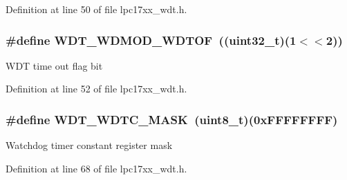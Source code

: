 \-Definition at line 50 of file lpc17xx\-\_\-wdt.\-h.

\hypertarget{group___w_d_t___private___macros_ga5e9c3c0c485b694053bdd3e43d5a9730}{
\subsubsection[{\-W\-D\-T\-\_\-\-W\-D\-M\-O\-D\-\_\-\-W\-D\-T\-O\-F}]{\setlength{\rightskip}{0pt plus 5cm}\#define {\bf \-W\-D\-T\-\_\-\-W\-D\-M\-O\-D\-\_\-\-W\-D\-T\-O\-F}~((uint32\-\_\-t)(1$<$$<$2))}}\label{group___w_d_t___private___macros_ga5e9c3c0c485b694053bdd3e43d5a9730}
\-W\-D\-T time out flag bit 

\-Definition at line 52 of file lpc17xx\-\_\-wdt.\-h.

\hypertarget{group___w_d_t___private___macros_ga7079274d8f548b3acc309a483c5c374e}{
\subsubsection[{\-W\-D\-T\-\_\-\-W\-D\-T\-C\-\_\-\-M\-A\-S\-K}]{\setlength{\rightskip}{0pt plus 5cm}\#define {\bf \-W\-D\-T\-\_\-\-W\-D\-T\-C\-\_\-\-M\-A\-S\-K}~(uint8\-\_\-t)(0x\-F\-F\-F\-F\-F\-F\-F\-F)}}\label{group___w_d_t___private___macros_ga7079274d8f548b3acc309a483c5c374e}
\-Watchdog timer constant register mask 

\-Definition at line 68 of file lpc17xx\-\_\-wdt.\-h.

